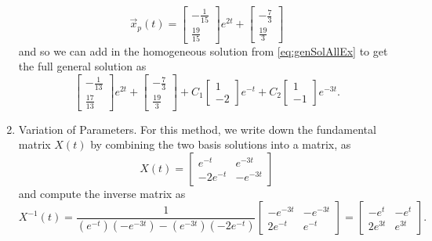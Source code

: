 \documentclass{ximera}
\begin{document}
\begin{exampleSol}
\begin{enumerate}
\begin{equation*}
                \vec{x}_p(t) = \begin{bmatrix} -\frac{1}{15} \\ \frac{19}{15} \end{bmatrix} e^{2t} + \begin{bmatrix} -\frac{7}{3} \\ \frac{19}{3} \end{bmatrix}
            \end{equation*}
            and so we can add in the homogeneous solution from \eqref{eq:genSolAllEx} to get the full general solution as
            \begin{equation} \label{eq:AllExUC}
                \begin{bmatrix} -\frac{1}{13} \\ \frac{17}{13} \end{bmatrix} e^{2t} + \begin{bmatrix} -\frac{7}{3} \\ \frac{19}{3} \end{bmatrix} + C_1\begin{bmatrix} 1 \\ -2 \end{bmatrix}e^{-t} + C_2\begin{bmatrix} 1 \\ -1 \end{bmatrix}e^{-3t}.
            \end{equation}
        \item Variation of Parameters. For this method, we write down the fundamental matrix $X(t)$ by combining the two basis solutions into a matrix, as
            \begin{equation*}
                X(t) = \begin{bmatrix} e^{-t} & e^{-3t} \\ -2e^{-t} & -e^{-3t} \end{bmatrix}
            \end{equation*}
            and compute the inverse matrix as
            \begin{equation*}
                X^{-1}(t) = \frac{1}{(e^{-t})(-e^{-3t}) - (e^{-3t})(-2e^{-t})}\begin{bmatrix} -e^{-3t} & -e^{-3t} \\ 2e^{-t} & e^{-t} \end{bmatrix} = \begin{bmatrix} -e^{t} & -e^{t} \\ 2e^{3t} & e^{3t} \end{bmatrix}.
            \end{equation*}

\end{enumerate}
\end{exampleSol}
\end{document}
